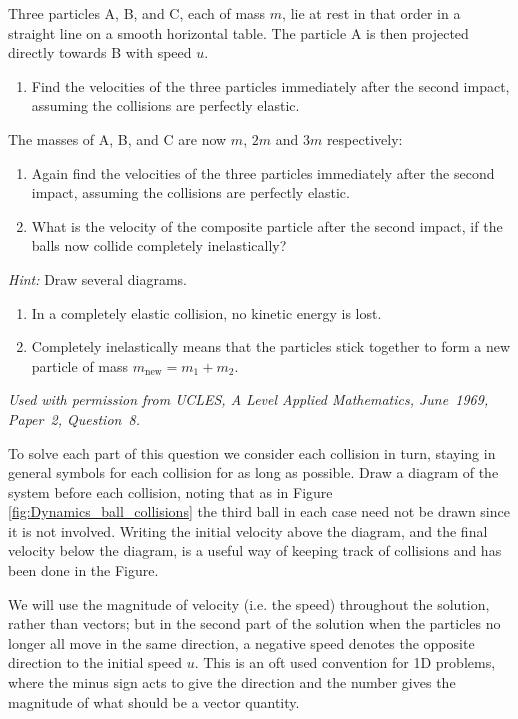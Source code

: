 
\begin{problem}[A1969AMIIQ8l] %
{Three particles A, B, and C, each of mass $m$, lie at rest in that order in a straight line on a smooth horizontal table. The particle A is then projected directly towards B with speed $u$. 
\begin{enumerate}
	\item Find the velocities of the three particles immediately after the second impact, assuming the collisions are perfectly elastic.
\end{enumerate}
The masses of A, B, and C are now $m$, $2m$ and $3m$ respectively:
\begin{enumerate}[resume]
	\item Again find the velocities of the three particles immediately after the second impact, assuming the collisions are perfectly elastic.
	\item What is the velocity of the composite particle after the second impact, if the balls now collide completely inelastically?
\end{enumerate}

\emph{Hint:} Draw several diagrams.
\begin{enumerate}
	\item In a completely elastic collision, no kinetic energy is lost.
	\item Completely inelastically means that the particles stick together to form a new particle of mass $m_{\text{new}} = m_{1} + m_{2}$.
\end{enumerate}
}
{\textit{Used with permission from UCLES, A Level Applied Mathematics, June~1969, Paper~2, Question~8.}}
{To solve each part of this question we consider each collision in turn, staying in general symbols for each collision for as long as possible. Draw a diagram of the system before each collision, noting that as in Figure \ref{fig:Dynamics_ball_collisions} the third ball in each case need not be drawn since it is not involved. Writing the initial velocity above the diagram, and the final velocity below the diagram, is a useful way of keeping track of collisions and has been done in the Figure. 

We will use the magnitude of velocity (i.e. the speed) throughout the solution, rather than vectors; but in the second part of the solution when the particles no longer all move in the same direction, a negative speed denotes the opposite direction to the initial speed $u$. This is an oft used convention for 1D problems, where the minus sign acts to give the direction and the number gives the magnitude of what should be a vector quantity.

}
\end{problem}
